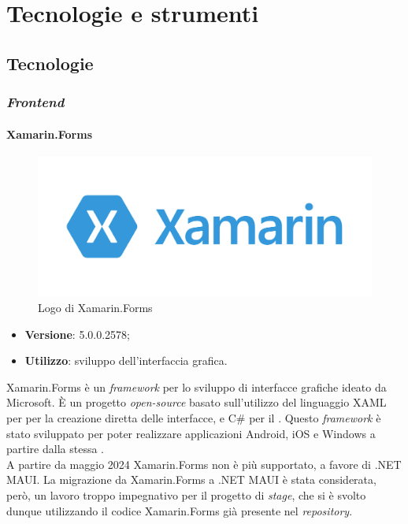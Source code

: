\chapter{Tecnologie e strumenti}
\label{cap:tecnologie-strumenti}


\section{Tecnologie}

\subsection{\textit{Frontend}}

\subsubsection{Xamarin.Forms}

\begin{figure}[H]
    \centering 
    \includegraphics[width=0.4\columnwidth]{images/loghi/xamarin-logo.png} 
    \caption{Logo di Xamarin.Forms}
\end{figure}

\begin{itemize}
    \item \textbf{Versione}: 5.0.0.2578;
    \item \textbf{Utilizzo}: sviluppo dell'interfaccia grafica.
\end{itemize}

\noindent Xamarin.Forms è un \textit{framework} per lo sviluppo di interfacce grafiche ideato da Microsoft. È un progetto \textit{open-source} basato sull'utilizzo del linguaggio XAML per per la creazione diretta delle interfacce, e C\# per il \textit{}. Questo \textit{framework} è stato sviluppato per poter realizzare applicazioni Android, iOS e Windows a partire dalla stessa \textit{}.\\
A partire da maggio 2024 Xamarin.Forms non è più supportato, a favore di .NET MAUI. La migrazione da Xamarin.Forms a .NET MAUI è stata considerata, però, un lavoro troppo impegnativo per il progetto di \textit{stage}, che si è svolto dunque utilizzando il codice Xamarin.Forms già presente nel \textit{repository}.

